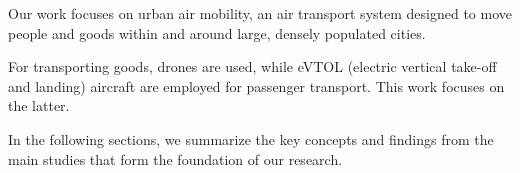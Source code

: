 \documentclass[../../thesis.tex]{subfiles}
\begin{document}
Our work focuses on urban air mobility, an air transport system designed to move people and goods within and around large, densely populated cities.

For transporting goods, drones are used, while eVTOL (electric vertical take-off and landing) aircraft are employed for passenger transport.
This work focuses on the latter.

In the following sections, we summarize the key concepts and findings from the main studies that form the foundation of our research.
\end{document}
